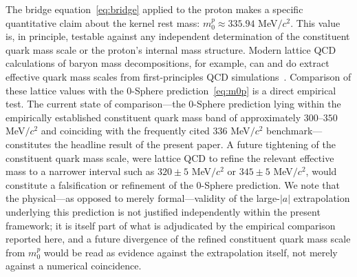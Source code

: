 \documentclass[%
 reprint, amsmath,amssymb, aps, prc, ]{revtex4-2}
\numberwithin{equation}{section}
\begin{document}
The bridge equation~\eqref{eq:bridge} applied to the proton makes a specific quantitative claim about the kernel rest mass: $m_0^p \approx 335.94$ MeV$/c^2$.
This value is, in principle, testable against any independent determination of the constituent quark mass scale or the proton's internal mass structure.
Modern lattice QCD calculations of baryon mass decompositions, for example, can and do extract effective quark mass scales from first-principles QCD simulations~\cite{FLAG, BMW2008}.
Comparison of these lattice values with the 0-Sphere prediction~\eqref{eq:m0p} is a direct empirical test.
The current state of comparison---the 0-Sphere prediction lying within the empirically established constituent quark mass band of approximately $300\text{--}350$ MeV$/c^2$ and coinciding with the frequently cited $336$ MeV$/c^2$ benchmark---constitutes the headline result of the present paper.
A future tightening of the constituent quark mass scale, were lattice QCD to refine the relevant effective mass to a narrower interval such as $320 \pm 5$ MeV$/c^2$ or $345 \pm 5$ MeV$/c^2$, would constitute a falsification or refinement of the 0-Sphere prediction.
We note that the physical---as opposed to merely formal---validity of the large-$|a|$ extrapolation underlying this prediction is not justified independently within the present framework; it is itself part of what is adjudicated by the empirical comparison reported here, and a future divergence of the refined constituent quark mass scale from $m_0^p$ would be read as evidence against the extrapolation itself, not merely against a numerical coincidence.
\end{document}

